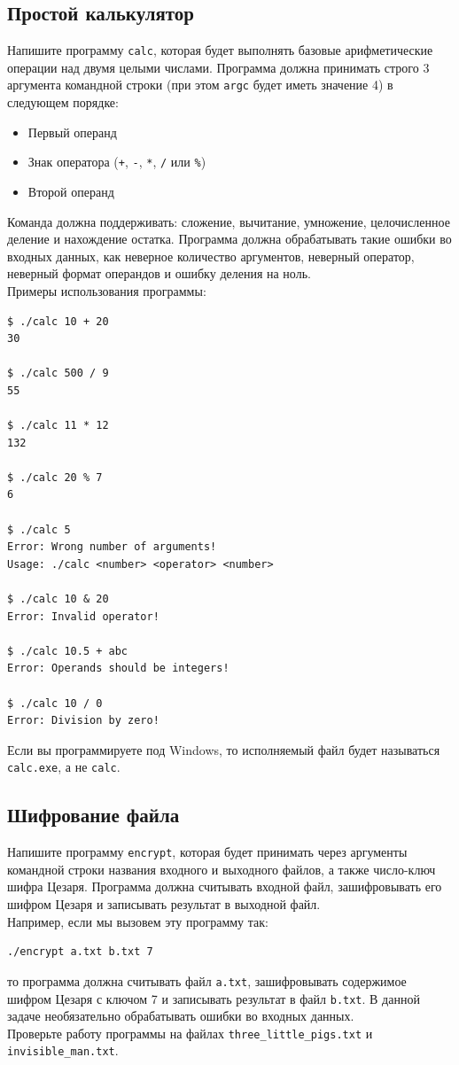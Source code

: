 \documentclass[10pt]{article}
\begin{document}
\subsection{Простой калькулятор}
Напишите программу \texttt{calc}, которая будет выполнять базовые арифметические операции над двумя целыми числами. Программа должна принимать строго 3 аргумента командной строки (при этом \texttt{argc} будет иметь значение 4) в следующем порядке:
\begin{itemize}
\item Первый операнд
\item Знак оператора (\texttt{+}, \texttt{-}, \texttt{*}, \texttt{/} или \texttt{\%})
\item Второй операнд
\end{itemize}
Команда должна поддерживать: сложение, вычитание, умножение, целочисленное деление и нахождение остатка. Программа должна обрабатывать такие ошибки во входных данных, как неверное количество аргументов, неверный оператор, неверный формат операндов и ошибку деления на ноль. \\
Примеры использования программы:
\begin{lstlisting}
$ ./calc 10 + 20
30

$ ./calc 500 / 9
55

$ ./calc 11 * 12
132

$ ./calc 20 % 7
6

$ ./calc 5
Error: Wrong number of arguments!
Usage: ./calc <number> <operator> <number>

$ ./calc 10 & 20
Error: Invalid operator!

$ ./calc 10.5 + abc
Error: Operands should be integers!

$ ./calc 10 / 0
Error: Division by zero!
\end{lstlisting}
Если вы программируете под Windows, то исполняемый файл будет называться \texttt{calc.exe}, а не \texttt{calc}.


\subsection{Шифрование файла}
Напишите программу \texttt{encrypt}, которая будет принимать через аргументы командной строки названия входного и выходного файлов, а также число-ключ шифра Цезаря. Программа должна считывать входной файл, зашифровывать его шифром Цезаря и записывать результат в выходной файл.\\
Например, если мы вызовем эту программу так:
\begin{verbatim}
./encrypt a.txt b.txt 7
\end{verbatim}
то программа должна считывать файл \texttt{a.txt}, зашифровывать содержимое шифром Цезаря с ключом 7 и записывать результат в файл \texttt{b.txt}. В данной задаче необязательно обрабатывать ошибки во входных данных.\\
Проверьте работу программы на файлах \texttt{three\_little\_pigs.txt} и \texttt{invisible\_man.txt}.
\end{document}
